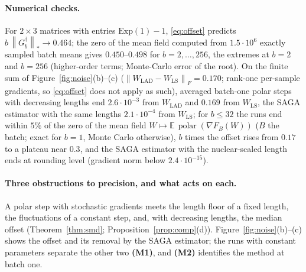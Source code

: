 \documentclass[10pt]{article}
\theoremstyle{remark}
\newcommand{\E}{\mathbb{E}}
\newcommand{\nnuc}[1]{\left\|#1\right\|_{*}}
\newcommand{\nF}[1]{\left\|#1\right\|_{F}}
\newcommand{\polar}{\operatorname{polar}}
\newcommand{\finding}[1]{\textbf{(#1)}}
\begin{document}
\paragraph{Numerical checks.} For $2\times3$ matrices with entries $\mathrm{Exp}(1)-1$, \eqref{eq:offset} predicts
$b\,\nnuc{G_b^\dagger}\to0.464$; the zero of the mean field computed from $1.5\cdot10^6$ exactly sampled batch means
gives $0.450$--$0.498$ for $b=2,\dots,256$, the extremes at $b=2$ and $b=256$ (higher-order terms; Monte-Carlo
error of the root). On the finite sum of Figure~\ref{fig:noise}(b)--(c)
($\nF{W_{\mathrm{LAD}}-W_{\mathrm{LS}}}=0.170$; rank-one per-sample gradients, so \eqref{eq:offset} does not apply as
such), averaged batch-one polar steps with decreasing lengths end $2.6\cdot10^{-3}$ from $W_{\mathrm{LAD}}$ and $0.169$
from $W_{\mathrm{LS}}$, the SAGA estimator with the same lengths $2.1\cdot10^{-4}$ from $W_{\mathrm{LS}}$; for $b\le32$
the runs end within $5\%$ of the zero of the mean field $W\mapsto\E\,\polar(\nabla F_B(W))$ ($B$ the batch; exact
for $b=1$, Monte Carlo otherwise), $b$ times the offset
rises from $0.17$ to a plateau near $0.3$, and the SAGA estimator with the nuclear-scaled length ends at rounding level
(gradient norm below $2.4\cdot10^{-15}$).

\paragraph{Three obstructions to precision, and what acts on each.} A polar step with stochastic gradients meets the
length floor of a fixed length, the fluctuations of a constant step, and, with decreasing lengths, the median offset
(Theorem~\ref{thm:smd}; Proposition~\ref{prop:comp}(d)). Figure~\ref{fig:noise}(b)--(c) shows the offset and its removal by the SAGA estimator; the runs
with constant parameters separate the other two \finding{M1}, and \finding{M2} identifies the method at batch one.
\end{document}

